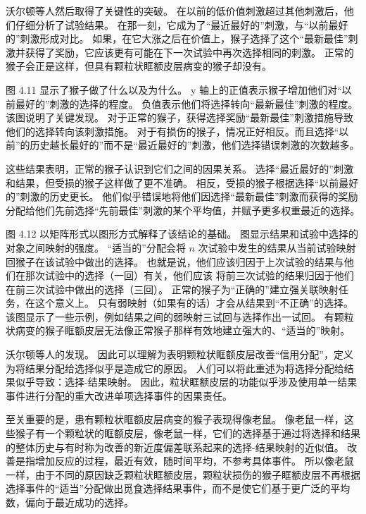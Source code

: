沃尔顿等人然后取得了关键性的突破。
在以前的低价值刺激超过其他刺激后，他们仔细分析了试验结果。
在那一刻，它成为了“最近最好的”刺激，与“以前最好的”刺激形成对比。
如果，在它大涨之后在价值上，猴子选择了这个“最新最佳”刺激并获得了奖励，它应该更有可能在下一次试验中再次选择相同的刺激。
正常的猴子会正是这样，但具有颗粒状眶额皮层病变的猴子却没有。\par


图 4.11 显示了猴子做了什么以及为什么。
y 轴上的正值表示猴子增加他们对“以前最好的”刺激的选择的程度。
负值表示他们将选择转向“最新最佳”刺激的程度。
该图说明了关键发现。
对于正常的猴子，获得选择奖励“最新最佳”刺激措施导致他们的选择转向该刺激措施。
对于有损伤的猴子，情况正好相反。而且选择“以前”的历史越长最好的”而不是“最近最好的”刺激，他们选择错误刺激的次数越多。\par


这些结果表明，正常的猴子认识到它们之间的因果关系。
选择“最近最好的”刺激和结果，但受损的猴子这样做了更不准确。
相反，受损的猴子根据选择“以前最好的”刺激的历史更长。
他们似乎错误地将他们因选择“最新最佳”刺激而获得的奖励分配给他们先前选择“先前最佳”刺激的某个平均值，并赋予更多权重最近的选择。\par


图 4.12 以矩阵形式以图形方式解释了该结论的基础。
图显示结果和试验中选择的对象之间映射的强度。
“适当的”分配会将 $ n $ 次试验中发生的结果从当前试验映射回猴子在该试验中做出的选择。
也就是说，他们应该归因于上次试验的结果与他们在那次试验中的选择（一回）有关，他们应该
将前三次试验的结果归因于他们在前三次试验中做出的选择（三回）。
正常的猴子为“正确的”建立强关联映射任务，在这个意义上。
只有弱映射（如果有的话）才会从结果到“不正确”的选择。
该图显示了一些示例，例如结果之间的弱映射三试回与选择作出一试回。
有颗粒状病变的猴子眶额皮层无法像正常猴子那样有效地建立强大的、“适当的”映射。\par


沃尔顿等人的发现。
因此可以理解为表明颗粒状眶额皮层改善“信用分配”，定义为将结果分配给选择似乎是造成它的原因。
人们可以将此重述为将选择分配给结果似乎导致：选择-结果映射。
因此，粒状眶额皮层的功能似乎涉及使用单一结果事件进行分配的重大改进单项选择事件的因果责任。\par


至关重要的是，患有颗粒状眶额皮层病变的猴子表现得像老鼠。
像老鼠一样，这些猴子有一个颗粒状的眶额皮层，像老鼠一样，它们的选择基于通过将选择和结果的整体历史与有时称为改善的新近度偏差联系起来的选择-结果映射的近似值\cite{herrnstein1991melioration}。
改善是指增加反应的过程，最近有效，随时间平均，不参考具体事件。
所以像老鼠一样，由于不同的原因缺乏颗粒状眶额皮层，颗粒状损伤的猴子眶额皮层不再根据选择事件的“适当”分配做出觅食选择结果事件，而不是使它们基于更广泛的平均数，偏向于最近成功的选择。\par


